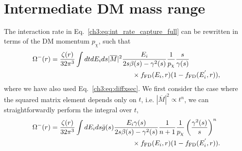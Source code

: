 \section{Intermediate DM mass range}
\label{app:sec:capratesimple}
The interaction rate in Eq.~\ref{ch3:eq:int_rate_capture_full} can be rewritten in terms of the DM momentum $p_\chi$, such that
\begin{equation} 
    \begin{split}
        \Omega^{-}(r) &= \frac{\zeta(r)}{32\pi^3}\int dt d\Ei ds |\overline{M}|^2 \frac{\Ei}{2s\beta(s)-\gamma^2(s)} \frac{1}{p_\chi}\frac{s}{\gamma(s)}\\
        &\hspace{12em}\times\fFD(\Ei,r)(1-\fFD(\Ei^{'},r)),
    \end{split}
\end{equation}
where we have also used Eq.~\ref{ch3:eq:diffxsec}. We first consider the case where the squared matrix element depends only on $t$, i.e. $|\overline{M}|^2 \propto t^n$, 
we can straightforwardly  perform the integral over $t$, 
\begin{equation}
    \begin{split}
        \Omega^{-}(r) & = \frac{\zeta(r)}{32\pi^3}\int d\Ei ds \bar{g}(s) \frac{\Ei\gamma(s)}{2s\beta(s)-\gamma^2(s)}\frac{1}{n+1}\frac{1}{p_\chi}\left(\frac{\gamma^2(s)}{s}\right)^n\\
        & \hspace{12em} \times  \fFD(\Ei,r)(1-\fFD(\Ei^{'},r)).
    \end{split}
\end{equation}

